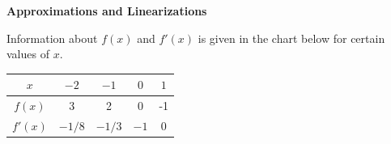 \documentclass{siproblemset}
\begin{document}
    \hspace{-5mm}\textbf{Approximations and Linearizations}
    \begin{multipartquestion}
        Information about $f(x)$ and $f'(x)$ is given in the chart below for certain values of $x$.
        
        \begin{center}
            \begin{tabular}{|c|c|c|c|c|}
                \hline
                $x$ & $-2$ & $-1$ & $0$ & $1$\\
                \hline
                $f(x)$ & 3 & 2 & 0 & -1 \\
                \hline
                $f'(x)$ & $-1/8$ & $-1/3$ & $-1$ & $0$\\
                \hline
            \end{tabular}
        \end{center}
    
        \Smallsp
    \end{multipartquestion}
    \newpage
    \largesp
\end{document}
